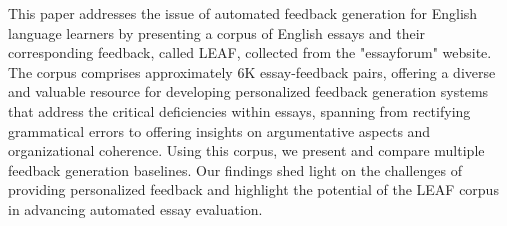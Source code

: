 This paper addresses the issue of automated feedback generation for English language learners by presenting a corpus of English essays and their corresponding feedback, called LEAF, collected from the "essayforum" website. The corpus comprises approximately 6K essay-feedback pairs, offering a diverse and valuable resource for developing personalized feedback generation systems that address the critical deficiencies within essays, spanning from rectifying grammatical errors to offering insights on argumentative aspects and organizational coherence. Using this corpus, we present and compare multiple feedback generation baselines. Our findings shed light on the challenges of providing personalized feedback and highlight the potential of the LEAF corpus in advancing automated essay evaluation.